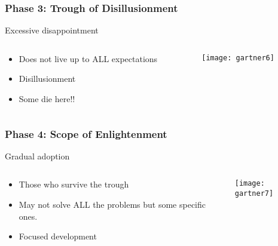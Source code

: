 \begin{frame}[fragile]\frametitle{Phase 3: Trough of Disillusionment}

Excessive disappointment

 \begin{columns}
  \begin{column}{0.55\linewidth}
\begin{itemize}
\item Does not live up to ALL expectations
\item Disillusionment
\item Some die here!!
\end{itemize}
  \end{column}%
  \begin{column}{0.45\linewidth}
			\begin{center}
			\texttt{[image: gartner6]}
			\end{center}
  \end{column}
 \end{columns}
 
\end{frame}

\begin{frame}[fragile]\frametitle{Phase 4: Scope of Enlightenment}

Gradual adoption

 \begin{columns}
  \begin{column}{0.55\linewidth}
\begin{itemize}
\item Those who survive the trough
\item May not solve ALL the problems but some specific ones.
\item Focused development
\end{itemize}
  \end{column}%
  \begin{column}{0.45\linewidth}
			\begin{center}
			\texttt{[image: gartner7]}
			\end{center}
  \end{column}
 \end{columns}
 
\end{frame}


